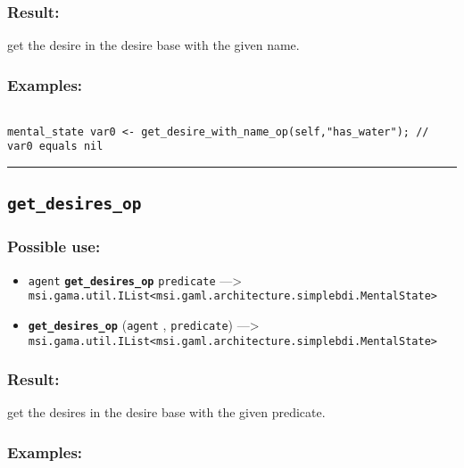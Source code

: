 \documentclass[]{book}
\providecommand{\tightlist}{%
  \setlength{\itemsep}{0pt}\setlength{\parskip}{0pt}}
\theoremstyle{definition}
\theoremstyle{definition}
\theoremstyle{definition}
\theoremstyle{remark}
\begin{document}
\subsubsection{Result:}\label{result-198}

get the desire in the desire base with the given name.

\subsubsection{Examples:}\label{examples-151}

\begin{verbatim}
 
mental_state var0 <- get_desire_with_name_op(self,"has_water"); // var0 equals nil
\end{verbatim}

\begin{center}\rule{0.5\linewidth}{\linethickness}\end{center}

\subsection{\texorpdfstring{\texttt{get\_desires\_op}}{get\_desires\_op}}\label{get_desires_op}

\subsubsection{Possible use:}\label{possible-use-205}

\begin{itemize}
\tightlist
\item
  \texttt{agent} \textbf{\texttt{get\_desires\_op}} \texttt{predicate}
  ---\textgreater{}
  \texttt{msi.gama.util.IList\textless{}msi.gaml.architecture.simplebdi.MentalState\textgreater{}}
\item
  \textbf{\texttt{get\_desires\_op}} (\texttt{agent} ,
  \texttt{predicate}) ---\textgreater{}
  \texttt{msi.gama.util.IList\textless{}msi.gaml.architecture.simplebdi.MentalState\textgreater{}}
\end{itemize}

\subsubsection{Result:}\label{result-199}

get the desires in the desire base with the given predicate.

\subsubsection{Examples:}\label{examples-152}
\end{document}
